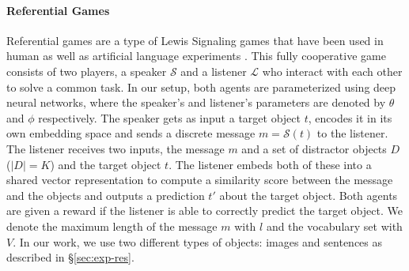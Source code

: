\documentclass{article}
\begin{document}
\paragraph{Referential Games}
Referential games are a type of Lewis Signaling games \citep{lewis1969convention} that have been used in human as well as artificial language experiments \citep{havrylov_emergence_2017,lazaridou_emergence_2018,evtimova2018emergent,lee_emergent_2017,li_ease--teaching_2019,gupta-etal-2019-seeded}. This fully cooperative game consists of two players, a speaker $\mathcal{S}$ and a listener $\mathcal{L}$ who interact with each other to solve a common task. In our setup, both agents are parameterized using deep neural networks, where the speaker's and listener's parameters are denoted by $\theta$ and $\phi$ respectively. The speaker gets as input a target object $t$, encodes it in its own embedding space and sends a discrete message $m = \mathcal{S}(t)$ to the listener. The listener receives two inputs, the message $m$ and a set of distractor objects $D$ ($|D|=K$) and the target object $t$. The listener embeds both of these into a shared vector representation to compute a similarity score between the message and the objects and outputs a prediction $t'$ about the target object. Both agents are given a reward if the listener is able to correctly predict the target object. We denote the maximum length of the message $m$ with $l$ and the vocabulary set with $V$. In our work, we use two different types of objects: images and sentences as described in \S\ref{sec:exp-res}.
\end{document}

